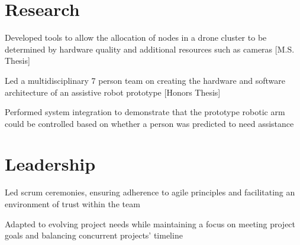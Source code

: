 \documentclass[]{deedy-resume-reversed}
\begin{document}
\begin{minipage}[t]{0.70\textwidth}
\section{Research}
\descript{}
\begin{tightemize}
\item Developed tools to allow the allocation of nodes in a drone cluster to be determined by hardware quality and additional resources such as cameras [M.S. Thesis]
\item Led a multidisciplinary 7 person team on creating the hardware and software architecture of an assistive robot prototype [Honors Thesis]
\item Performed system integration to demonstrate that the prototype robotic arm could be controlled based on whether a person was predicted to need assistance 
\end{tightemize}
\sectionsep


\section{Leadership}
\begin{tightemize}
\item Led scrum ceremonies, ensuring adherence to agile principles and facilitating an environment of trust within the team
\item Adapted to evolving project needs while maintaining a focus on meeting project goals and balancing concurrent projects' timeline
\end{tightemize}


\end{minipage}
\end{document}
